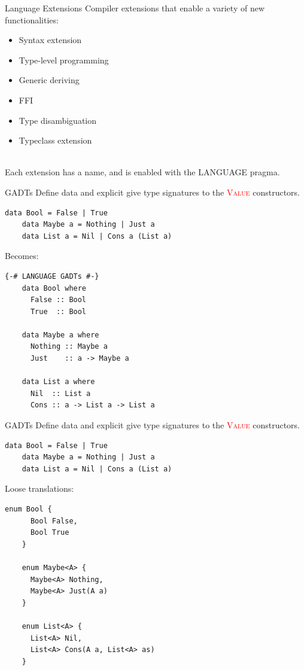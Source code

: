 \documentclass[xcolor={usenames,dvipsnames}]{beamer}
\newcommand{\hvalcon}[1]{\textcolor{Red}{\textsc{#1}}}
\begin{document}
\begin{frame}[fragile]{Language Extensions}
  Compiler extensions that enable a variety of new functionalities:
  \begin{itemize}
    \item Syntax extension
    \item Type-level programming
    \item Generic deriving
    \item FFI
    \item Type disambiguation
    \item Typeclass extension
  \end{itemize}

  \ \\
  Each extension has a name, and is enabled with the LANGUAGE pragma.
\end{frame}

\begin{frame}[fragile]{GADTs}
  Define data and explicit give type signatures to the \hvalcon{Value} constructors.
  \begin{lstlisting}[style=hask]
    data Bool = False | True
    data Maybe a = Nothing | Just a
    data List a = Nil | Cons a (List a)
  \end{lstlisting}

  Becomes:
  \begin{lstlisting}[style=hask]
    {-# LANGUAGE GADTs #-}
    data Bool where
      False :: Bool
      True  :: Bool

    data Maybe a where
      Nothing :: Maybe a
      Just    :: a -> Maybe a

    data List a where
      Nil  :: List a
      Cons :: a -> List a -> List a
  \end{lstlisting}
\end{frame}

\begin{frame}[fragile]{GADTs}
  Define data and explicit give type signatures to the \hvalcon{Value} constructors.
  \begin{lstlisting}[style=hask]
    data Bool = False | True
    data Maybe a = Nothing | Just a
    data List a = Nil | Cons a (List a)
  \end{lstlisting}

  Loose translations:
  \begin{lstlisting}[style=hask]
    enum Bool {
      Bool False,
      Bool True
    }

    enum Maybe<A> {
      Maybe<A> Nothing,
      Maybe<A> Just(A a)
    }

    enum List<A> {
      List<A> Nil,
      List<A> Cons(A a, List<A> as)
    }
  \end{lstlisting}
\end{frame}
\end{document}
